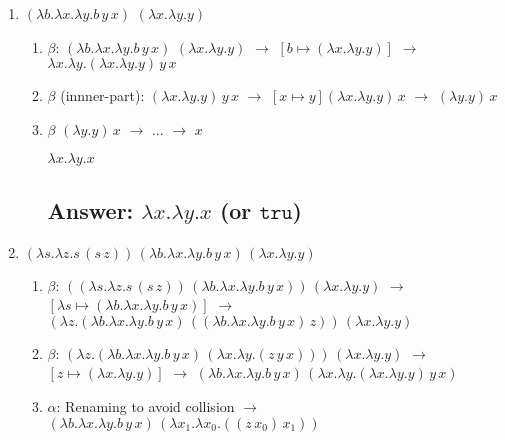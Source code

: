 \documentclass{article}
\begin{document}
\begin{enumerate}
\begin{enumerate}
        \item $(\lambda b.\lambda x.\lambda y.b \, y \, x)$ $(\lambda x.\lambda y.y)$
        \begin{enumerate}
            \item $\beta$: 
            $(\lambda b.\lambda x.\lambda y.b \, y \, x)$ $(\lambda x.\lambda y.y)$ 
            $\rightarrow$ $[b \mapsto (\lambda x.\lambda y.y)]$
            $\rightarrow$ $\lambda x.\lambda y.(\lambda x.\lambda y.y) \, y \, x$
            \item $\beta$ (innner-part): $(\lambda x.\lambda y.y) \, y \, x$
            $\rightarrow$ $[x \mapsto y](\lambda x.\lambda y.y) \, x$
            $\rightarrow$ $(\lambda y.y) \, x$
            \item $\beta$ $(\lambda y.y) \, x$ $\rightarrow$ $...$ $\rightarrow$ $x$
            \begin{center}
                $\lambda x.\lambda y. x$
            \end{center}
            \subsection*{Answer: $\lambda x.\lambda y. x$ (or $\texttt{tru}$)}
        \end{enumerate}        

    

        \item $(\lambda s.\lambda z.s \, (s \, z)) \, (\lambda b.\lambda x.\lambda y.b \, y \, x) \, (\lambda x.\lambda y.y)$
    \begin{enumerate}
        \item $\beta$: 
        $((\lambda s. \lambda z. s \, (s \, z)) \, (\lambda b.\lambda x.\lambda y.b \, y \, x)) \, (\lambda x.\lambda y.y)$
        $\rightarrow$ $[\lambda s \mapsto (\lambda b.\lambda x.\lambda y.b \, y \, x)]$
        $\rightarrow$ $(\lambda z. (\lambda b.\lambda x.\lambda y.b \, y \, x) \, ((\lambda b.\lambda x.\lambda y.b \, y \, x) \, z)) \, (\lambda x.\lambda y.y)$
        
        \item $\beta$:
        $(\lambda z. (\lambda b.\lambda x.\lambda y.b \, y \, x) \, (\lambda x.\lambda y.(z \, y \, x))) \, (\lambda x.\lambda y.y)$
        $\rightarrow$ $[z \mapsto (\lambda x.\lambda y.y)]$
        $\rightarrow$ $(\lambda b.\lambda x.\lambda y.b \, y \, x) \, (\lambda x.\lambda y.(\lambda x.\lambda y.y) \, y \, x)$
        
        \item $\alpha$: Renaming to avoid collision
        $\rightarrow$ $(\lambda b.\lambda x.\lambda y.b \, y \, x) \, (\lambda x_1.\lambda x_0.((z \, x_0) \, x_1))$
        

\end{enumerate}
\end{enumerate}
\end{enumerate}
\end{document}
